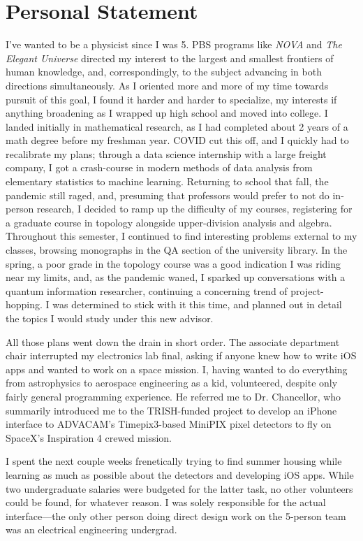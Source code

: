 \documentclass[12pt]{article}
\begin{document}
\section*{Personal Statement}
I've wanted to be a physicist since I was 5.
PBS programs like \textit{NOVA} and \textit{The Elegant Universe} directed my interest to the largest and smallest frontiers of human knowledge,
and, correspondingly, to the subject advancing in both directions simultaneously.
As I oriented more and more of my time towards pursuit of this goal, I found it harder and harder to specialize,
my interests if anything broadening as I wrapped up high school and moved into college.
I landed initially in mathematical research, as I had completed about 2 years of a math degree before my freshman year.
COVID cut this off, and I quickly had to recalibrate my plans; through a data science internship with a large freight company,
I got a crash-course in modern methods of data analysis from elementary statistics to machine learning.
Returning to school that fall, the pandemic still raged, and, presuming that professors would prefer to not do in-person research,
I decided to ramp up the difficulty of my courses, registering for a graduate course in topology alongside upper-division analysis and algebra.
Throughout this semester, I continued to find interesting problems external to my classes, browsing monographs in the QA section of the university library.
In the spring, a poor grade in the topology course was a good indication I was riding near my limits, and, as the pandemic waned,
I sparked up conversations with a quantum information researcher, continuing a concerning trend of project-hopping.
I was determined to stick with it this time, and planned out in detail the topics I would study under this new advisor.

All those plans went down the drain in short order.
The associate department chair interrupted my electronics lab final, asking if anyone knew how to write iOS apps and wanted to work on a space mission.
I, having wanted to do everything from astrophysics to aerospace engineering as a kid, volunteered, despite only fairly general programming experience.
He referred me to Dr. Chancellor, who summarily introduced me to the TRISH-funded project
to develop an iPhone interface to ADVACAM's Timepix3-based MiniPIX pixel detectors to fly on SpaceX's Inspiration 4 crewed mission.

I spent the next couple weeks frenetically trying to find summer housing while learning as much as possible about the detectors and developing iOS apps.
While two undergraduate salaries were budgeted for the latter task, no other volunteers could be found, for whatever reason.
I was solely responsible for the actual interface---the only other person doing direct design work
on the 5-person team was an electrical engineering undergrad.
\end{document}
